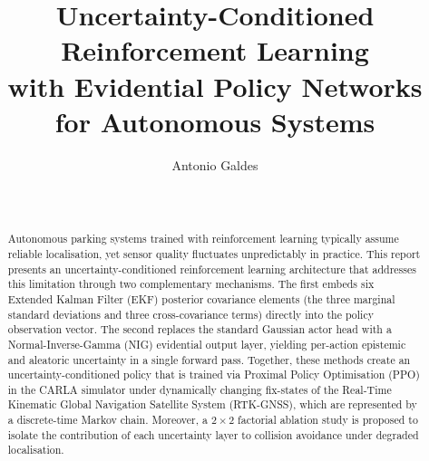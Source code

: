 \documentclass{sig-alternate}
\begin{document}

\title{Uncertainty-Conditioned Reinforcement Learning\\ with Evidential Policy Networks\\ for Autonomous Systems}

\author{
    \alignauthor Antonio Galdes\\
        \\
        \\
}
\maketitle

\begin{abstract}
Autonomous parking systems trained with reinforcement learning typically assume reliable localisation, yet sensor quality fluctuates unpredictably in practice. This report presents an uncertainty-conditioned reinforcement learning architecture that addresses this limitation through two complementary mechanisms. The first embeds six Extended Kalman Filter (EKF) posterior covariance elements (the three marginal standard deviations and three cross-covariance terms) directly into the policy observation vector. The second replaces the standard Gaussian actor head with a Normal-Inverse-Gamma (NIG) evidential output layer, yielding per-action epistemic and aleatoric uncertainty in a single forward pass. Together, these methods create an uncertainty-conditioned policy that is trained via Proximal Policy Optimisation (PPO) in the CARLA simulator under dynamically changing fix-states of the Real-Time Kinematic Global Navigation Satellite System (RTK-GNSS), which are represented by a discrete-time Markov chain. Moreover, a $2 \times 2$ factorial ablation study is proposed to isolate the contribution of each uncertainty layer to collision avoidance under degraded localisation.
\end{abstract}

\end{document}
